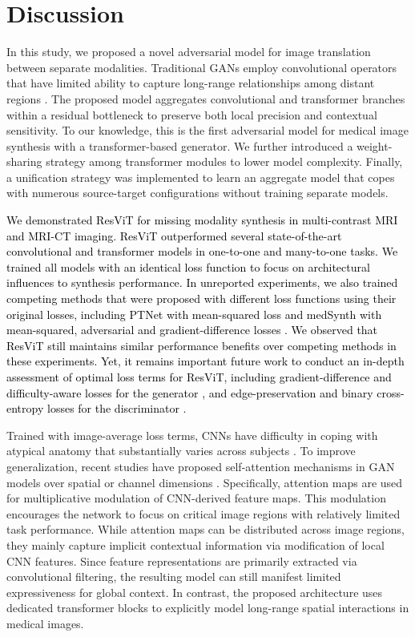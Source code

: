 \documentclass[journal,twoside,web]{ieeecolor}
\newcommand*{\revhl}{\textcolor{black}}
\begin{document}
\section{Discussion}
\par
In this study, we proposed a novel adversarial model for image translation between separate modalities. Traditional GANs employ convolutional operators that have limited ability to capture long-range relationships among distant regions \cite{kodali2018}. The proposed model aggregates convolutional and transformer branches within a residual bottleneck to preserve both local precision and contextual sensitivity. To our knowledge, this is the first adversarial model for medical image synthesis with a transformer-based generator. We further introduced a weight-sharing strategy among transformer modules to lower model complexity. Finally, a unification strategy was implemented to learn an aggregate model that copes with numerous source-target configurations without training separate models. 

\par
\revhl{We demonstrated ResViT for missing modality synthesis in multi-contrast MRI and MRI-CT imaging. ResViT outperformed several state-of-the-art convolutional and transformer models in one-to-one and many-to-one tasks. We trained all models with an identical loss function to focus on architectural influences to synthesis performance. In unreported experiments, we also trained competing methods that were proposed with different loss functions using their original losses, including PTNet with mean-squared loss \cite{ptnet} and medSynth with mean-squared, adversarial and gradient-difference losses \cite{nie2018}. We observed that ResViT still maintains similar performance benefits over competing methods in these experiments. Yet, it remains important future work to conduct an in-depth assessment of optimal loss terms for ResViT, including gradient-difference and difficulty-aware losses for the generator \cite{nie2018,Luping1,Shen1}, and edge-preservation and binary cross-entropy losses for the discriminator \cite{Shen2,Shen1}.}

\par
Trained with image-average loss terms, CNNs have difficulty in coping with atypical anatomy that substantially varies across subjects \cite{pix2pix,pgan}. To improve generalization, recent studies have proposed self-attention mechanisms in GAN models over spatial or channel dimensions \cite{attention_unet,sagan}. Specifically, attention maps are used for multiplicative modulation of CNN-derived feature maps. This modulation encourages the network to focus on critical image regions with relatively limited task performance. While attention maps can be distributed across image regions, they mainly capture implicit contextual information via modification of local CNN features. Since feature representations are primarily extracted via convolutional filtering, the resulting model can still manifest limited expressiveness for global context. In contrast, the proposed architecture uses dedicated transformer blocks to explicitly model long-range spatial interactions in medical images.  
\end{document}

